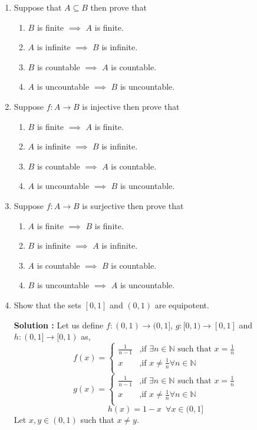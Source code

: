\documentclass[10pt]{article}
\newcommand{\nn}{\mathbb{N}}
\begin{document}
\begin{enumerate}
    \item Suppose that $A \subseteq B$ then prove that 
    \begin{enumerate}
        \item $B$ is finite $\implies$ $A$ is finite.
        \item $A$ is infinite $\implies$ $B$ is infinite.
        \item $B$ is countable $\implies$ $A$ is countable.
        \item $A$ is uncountable $\implies$ $B$ is uncountable.
    \end{enumerate}
    \item Suppose $f : A \to B$ is injective then prove that 
    \begin{enumerate}
        \item $B$ is finite $\implies$ $A$ is finite.
        \item $A$ is infinite $\implies$ $B$ is infinite.
        \item $B$ is countable $\implies$ $A$ is countable.
        \item $A$ is uncountable $\implies$ $B$ is uncountable.
    \end{enumerate}
    \item Suppose $f : A \to B$ is surjective then prove that 
    \begin{enumerate}
        \item $A$ is finite $\implies$ $B$ is finite.
        \item $B$ is infinite $\implies$ $A$ is infinite.
        \item $A$ is countable $\implies$ $B$ is countable.
        \item $B$ is uncountable $\implies$ $A$ is uncountable.
    \end{enumerate}
    \item Show that the sets $[0, 1]$ and $(0, 1)$ are equipotent.
    
    \textbf{Solution : }Let us define $f : (0, 1) \to (0, 1]$, $g : [0, 1) \to [0, 1]$ and $h: (0,1] \to [0, 1)$ as, 
    \begin{equation*}
        f(x) = 
        \begin{cases}
            \frac{1}{n-1} & \text{,if } \exists n \in \nn \text{ such that }x = \frac{1}{n}\\
            x & \text{,if } x \neq \frac{1}{n} \forall n \in \nn \\
        \end{cases}
    \end{equation*}
    \begin{equation*}
        g(x) = 
        \begin{cases}
            \frac{1}{n-1} & \text{,if } \exists n \in \nn \text{ such that }x = \frac{1}{n}\\
            x & \text{,if } x \neq \frac{1}{n} \forall n \in \nn \\
        \end{cases}
    \end{equation*}
    $$h(x) = 1 - x\,\,\, \forall x \in (0,1]$$
    Let $x, y \in (0, 1)$ such that $x \neq y$.
    

\end{enumerate}
\end{document}
